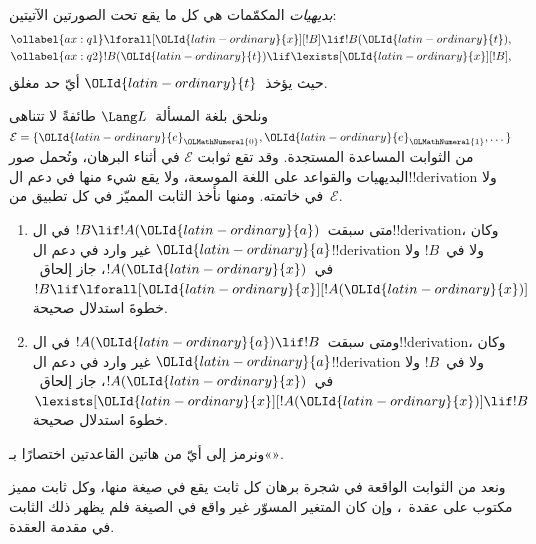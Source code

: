 \documentclass[../../../include/open-logic-section]{subfiles}
\begin{document}


\begin{defn}
\emph{بديهيات} المكمّمات هي كل ما يقع تحت الصورتين الآتيتين:
\begin{align}
\ollabel{ax:q1} & \lforall[\OLId{latin-ordinary}{x}][!B] \lif !B(\OLId{latin-ordinary}{t}), \\
\ollabel{ax:q2} & !B(\OLId{latin-ordinary}{t}) \lif \lexists[\OLId{latin-ordinary}{x}][!B],
\end{align}
حيث يؤخذ~$\OLId{latin-ordinary}{t}$ أيّ حد مغلق.
\end{defn}

ونلحق بلغة المسألة~$\Lang L$ طائفةً لا تتناهى
$\mathcal E=\{\OLId{latin-ordinary}{e}_\OLMathNumeral{0},\OLId{latin-ordinary}{e}_\OLMathNumeral{1},\dots\}$ من الثوابت المساعدة المستجدة. وقد تقع ثوابت
$\mathcal E$ في أثناء البرهان، وتُحمل صور البديهيات والقواعد على اللغة
الموسعة، ولا يقع شيء منها في دعم ال!!{derivation} ولا في خاتمته. ومنها
نأخذ الثابت المميّز في كل تطبيق من~$\mathcal E$.

\begin{defn}[قواعد المكمّمات]
\begin{enumerate}
\item متى سبقت~$!B \lif !A(\OLId{latin-ordinary}{a})$ في ال!!{derivation}، وكان
  $\OLId{latin-ordinary}{a}$ غير وارد في دعم ال!!{derivation} ولا في~$!B$ ولا في~$!A(\OLId{latin-ordinary}{x})$، جاز إلحاق~$!B \lif
  \lforall[\OLId{latin-ordinary}{x}][!A(\OLId{latin-ordinary}{x})]$ خطوةَ استدلال صحيحة.
\item ومتى سبقت~$!A(\OLId{latin-ordinary}{a}) \lif !B$ في ال!!{derivation}، وكان
  $\OLId{latin-ordinary}{a}$ غير وارد في دعم ال!!{derivation} ولا في~$!B$ ولا في~$!A(\OLId{latin-ordinary}{x})$، جاز إلحاق~$\lexists[\OLId{latin-ordinary}{x}][!A(\OLId{latin-ordinary}{x})] \lif
  !B$ خطوةَ استدلال صحيحة.
\end{enumerate}
\end{defn}

ونرمز إلى أيّ من هاتين القاعدتين اختصارًا بـ«\QR».

ونعد من الثوابت الواقعة في شجرة برهان كل ثابت يقع في صيغة منها، وكل ثابت
مميز مكتوب على عقدة~\QR{}، وإن كان المتغير المسوّر غير واقع في الصيغة فلم
يظهر ذلك الثابت في مقدمة العقدة.
\end{document}
